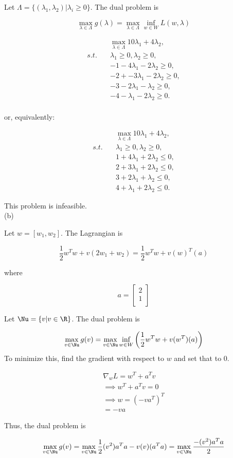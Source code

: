 \documentclass[../main.tex]{subfiles}
\begin{document}
Let $\Lambda = \{(\lambda_1, \lambda_2) | \lambda_{i} \geq 0\}$. The dual problem is

\[
    \max_{\lambda \in \Lambda} g(\lambda) = \max_{\lambda \in \Lambda} \inf_{w \in W}L(w, \lambda)\]

\begin{align*}
&\max_{\lambda \in \Lambda} 
    10\lambda_{1} + 4\lambda_{2} , \\
s.t.\quad & \lambda_1 \geq 0, \lambda_2 \geq 0, \\
& -1 - 4\lambda_1 -2\lambda_2 \geq 0, \\
& -2 + -3\lambda_1 - 2\lambda_2 \geq 0, \\
& -3 - 2\lambda_1 - \lambda_{2} \geq 0, \\
& -4 - \lambda_{1} - 2\lambda_{2} \geq 0.
\end{align*}
\\

or, equivalently:

\begin{align*}
&\max_{\lambda \in \Lambda} 
    10\lambda_{1} + 4\lambda_{2} , \\
s.t.\quad & \lambda_1 \geq 0, \lambda_2 \geq 0, \\
& 1 + 4\lambda_1 +2\lambda_2 \leq 0, \\
& 2  +3\lambda_1 + 2\lambda_2 \leq 0, \\
& 3 + 2\lambda_1 + \lambda_{2} \leq 0, \\
& 4 + \lambda_{1} + 2\lambda_{2} \leq 0.
\end{align*}

This problem is infeasible. \\

(b)

Let $w = [w_1, w_2]$. The Lagrangian is

\[
    \frac{1}{2} w^Tw + v(2w_1 + w_2) = \frac{1}{2} w^Tw + v(w)^T(a)
\]

where

\[
    a = \begin{bmatrix}
        2 \\
        1 \\
    \end{bmatrix}
\]

Let $\Nu = \{v | v \in \R \}$. The dual problem is

\[
    \max_{v \in \Nu} g(v) = \max_{v \in \Nu} \inf_{w \in W}\left(\frac{1}{2} w^Tw + v(w^T)(a)\right)
\]
To minimize this, find the gradient with respect to $w$ and set that to $0$.

\begin{align*}
    \nabla_{w} L =  w^T + a^Tv \\
    \implies w^T + a^Tv = 0 \\ \implies w = (-va^T)^T \\ = -va
\end{align*}

Thus, the dual problem is

\[
    \max_{v \in \Nu} g(v) = \max_{v \in \Nu} \frac{1}{2} (v^2)a^Ta - v(v)(a^Ta) = \max_{v \in \Nu} \frac{-(v^2)a^Ta}{2}
\]
\end{document}
